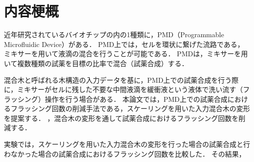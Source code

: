 \chapter*{内容梗概}
近年研究されているバイオチップの内の1種類に，PMD（Programmable Microfluidic Device）がある．
PMD上では，セルを環状に繋げた流路である，ミキサーを用いて液滴の混合を行うことが可能である．
PMDは，ミキサーを用いて複数種類の試薬を目標の比率で混合（試薬合成）する．

混合木と呼ばれる木構造の入力データを基に，PMD上での試薬合成を行う際に，ミキサーがセルに残した不要な中間液滴を緩衝液という液体で洗い流す（フラッシング）操作を行う場合がある．
本論文では，PMD上での試薬合成におけるフラッシング回数の削減手法である，スケーリングを用いた入力混合木の変形を提案する．
，混合木の変形を通して試薬合成におけるフラッシング回数を削減する．

実験では，スケーリングを用いた入力混合木の変形を行った場合の試薬合成と行わなかった場合の試薬合成におけるフラッシング回数を比較した．
その結果，

%
%
%
%
%
%
%
%
%
%
%
%

